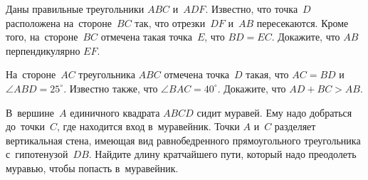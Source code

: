 \begin{problems}
\item
Даны правильные треугольники $ABC$ и~$ADF$.
Известно, что точка~$D$ расположена на~стороне~$BC$ так, что отрезки~$DF$
и~$AB$ пересекаются.
Кроме того, на~стороне~$BC$ отмечена такая точка~$E$, что $BD = EC$.
Докажите, что $AB$ перпендикулярно $EF$.

\item
На~стороне~$AC$ треугольника $ABC$ отмечена точка~$D$ такая, что
$AC = BD$ и~$\angle ABD = 25^{\circ}$.
Известно также, что $\angle BAC = 40^{\circ}$.
Докажите, что $AD + BC > AB$.

\item
В~вершине~$A$ единичного квадрата $ABCD$ сидит муравей.
Ему надо добраться до~точки~$C$, где находится вход в~муравейник.
Точки $A$ и~$C$ разделяет вертикальная стена, имеющая вид равнобедренного
прямоугольного треугольника с~гипотенузой~$DB$.
Найдите длину кратчайшего пути, который надо преодолеть муравью, чтобы попасть
в~муравейник.

\end{problems}

